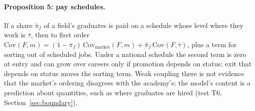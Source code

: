 \documentclass[11pt]{article}
\begin{document}
\paragraph{Proposition 5: pay schedules.} If a share $\bar\pi_f$ of a field's graduates is paid on a schedule
whose level where they work is $\bar\tau$, then to first order
$\mathrm{Cov}(F,m)=(1-\bar\pi_f)\,\mathrm{Cov}_{\text{market}}(F,m)+\bar\pi_f\,\mathrm{Cov}(F,\bar\tau)$, plus a
term for sorting out of scheduled jobs. Under a national schedule the second term is zero at entry and can grow
over careers only if promotion depends on status; exit that depends on status moves the sorting term. Weak
coupling there is not evidence that the market's ordering disagrees with the academy's; the model's content is a
prediction about quantities, such as where graduates are hired (test T6, Section~\ref{sec:boundary}).
\end{document}
